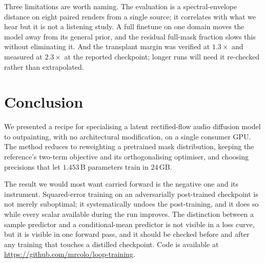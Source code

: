 \documentclass[10pt,twocolumn,letterpaper]{article}
\begin{document}
Three limitations are worth naming. The evaluation is a spectral-envelope
distance on eight paired renders from a single source; it correlates with what we
hear but it is not a listening study. A full finetune on one domain moves the
model away from its general prior, and the residual full-mask fraction slows this
without eliminating it. And the transplant margin was verified at $1.3\times$ and
measured at $2.3\times$ at the reported checkpoint; longer runs will need it
re-checked rather than extrapolated.

\section{Conclusion}

We presented a recipe for specialising a latent rectified-flow audio diffusion model to
outpainting, with no architectural modification, on a single consumer GPU. The method
reduces to reweighting a pretrained mask distribution, keeping the reference's two-term
objective and its orthogonalising optimiser, and choosing precisions that let $1.453$\,B
parameters train in $24$\,GB.

The result we would most want carried forward is the negative one and its instrument.
Squared-error training on an adversarially post-trained checkpoint is not merely
suboptimal; it systematically undoes the post-training, and it does so while every
scalar available during the run improves. The distinction between a sample predictor and
a conditional-mean predictor is not visible in a loss curve, but it is visible in one
forward pass, and it should be checked before and after any training that touches a
distilled checkpoint. Code is available at \url{https://github.com/mrcolo/loop-training}.
\end{document}
